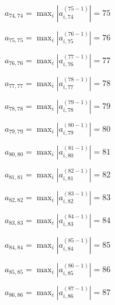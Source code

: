 \documentclass[a4paper,12pt]{article}
\begin{document}
$a _{ 74, 74 } =  \max _i |a _{ i, 74 } ^{ (75 - 1) } | = 75$

$a _{ 75, 75 } =  \max _i |a _{ i, 75 } ^{ (76 - 1) } | = 76$

$a _{ 76, 76 } =  \max _i |a _{ i, 76 } ^{ (77 - 1) } | = 77$

$a _{ 77, 77 } =  \max _i |a _{ i, 77 } ^{ (78 - 1) } | = 78$

$a _{ 78, 78 } =  \max _i |a _{ i, 78 } ^{ (79 - 1) } | = 79$

$a _{ 79, 79 } =  \max _i |a _{ i, 79 } ^{ (80 - 1) } | = 80$

$a _{ 80, 80 } =  \max _i |a _{ i, 80 } ^{ (81 - 1) } | = 81$

$a _{ 81, 81 } =  \max _i |a _{ i, 81 } ^{ (82 - 1) } | = 82$

$a _{ 82, 82 } =  \max _i |a _{ i, 82 } ^{ (83 - 1) } | = 83$

$a _{ 83, 83 } =  \max _i |a _{ i, 83 } ^{ (84 - 1) } | = 84$

$a _{ 84, 84 } =  \max _i |a _{ i, 84 } ^{ (85 - 1) } | = 85$

$a _{ 85, 85 } =  \max _i |a _{ i, 85 } ^{ (86 - 1) } | = 86$

$a _{ 86, 86 } =  \max _i |a _{ i, 86 } ^{ (87 - 1) } | = 87$
\end{document}
